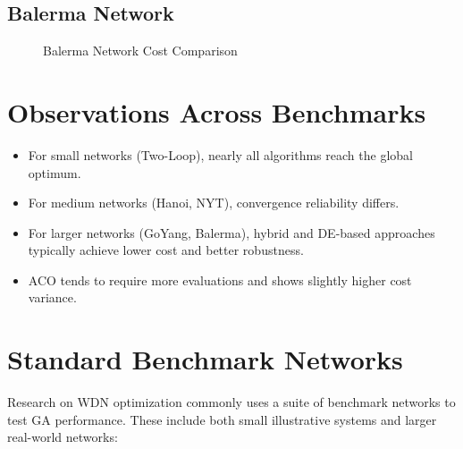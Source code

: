 \documentclass[12pt, a4paper]{article}
\begin{document}
\subsection{Balerma Network}

\begin{figure}[H]
	\centering
	\caption{Balerma Network Cost Comparison}
\end{figure}


\section{Observations Across Benchmarks}

\begin{itemize}
	\item For small networks (Two-Loop), nearly all algorithms reach the global optimum.
	\item For medium networks (Hanoi, NYT), convergence reliability differs.
	\item For larger networks (GoYang, Balerma), hybrid and DE-based approaches
	      typically achieve lower cost and better robustness.
	\item ACO tends to require more evaluations and shows slightly higher cost variance.
\end{itemize}


\section*{Standard Benchmark Networks}
Research on WDN optimization commonly uses a suite of benchmark networks to test GA performance. These include both small illustrative systems and larger real-world networks:
\end{document}
